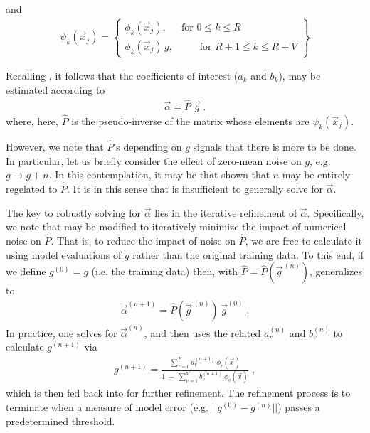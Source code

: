 \documentclass[twocolumn,aps,prd,floatfix,preprintnumbers,a4paper,nofootinbib,
superscriptaddress,10pt]{revtex4-1}
\begin{document}
%
and
%
\begin{align}
  \psi_k(\vec{x}_j) = \left\{\begin{array}{cc}
        \phi_k(\vec{x}_j),      & \text{for }0\leq k\leq R\\
        \phi_k(\vec{x}_j)\, g , & \quad \;\; \;\text{for }R+1\leq k\leq R+V
        \end{array} \right\}
\end{align}
%
\par Recalling , it follows that the coefficients of interest ($a_k$ and $b_k$), may be estimated according to
%
\begin{align}
  \label{eq:pinv2}
  \vec{\alpha} = \hat{P} \; \vec{g} \;.
\end{align}
%
where, here, $\hat{P}$ is the pseudo-inverse of the matrix whose elements are $\psi_k(\vec{x}_j)$.
%
\par However, we note that $\hat{P}$'s depending on $g$ signals that there is more to be done.
%
In particular, let us briefly consider the effect of zero-mean noise on $g$, e.g. $g \rightarrow g+n$.
%
In this contemplation, it may be that shown that $n$ may be entirely regelated to $\hat{P}$.
%
It is in this sense that  is insufficient to generally solve for $\vec{\alpha}$.
%
\par The key to robustly solving for $\vec{\alpha}$ lies in the iterative refinement of $\vec{\alpha}$.
%
Specifically, we note that  may be modified to iteratively minimize the impact of numerical noise on $\hat{P}$.
%
That is, to reduce the impact of noise on $\hat{P}$, we are free to calculate it using model evaluations of $g$ rather than the original training data.
%
To this end, if we define $g^{(0)}=g$ (i.e. the training data) then, with $\hat{P} = \hat{P}( \vec{g}^{\,(n)} )$,  generalizes to
%
\begin{align}
  \label{eq:pinv3}
  \vec{\alpha}^{(n+1)} = \hat{P}(\vec{g}^{\,(n)}) \, \vec{g}^{(0)}\;.
\end{align}
%
In practice, one solves  for $\vec{\alpha}^{(n)}$, and then uses the related $a_r^{(n)}$ and $b_v^{(n)}$ to calculate $g^{(n+1)}$ via
%
\begin{align}
  \label{eq:rat4}
  g^{(n+1)} =  \frac{ \sum_{r=0}^{R} a^{(n+1)}_r \, \phi_{r}(\vec{x}) }{ 1\;-\;  \sum_{v=1}^{V} b^{(n+1)}_v \, \phi_{v}(\vec{x}) } \; ,
\end{align}
%
which is then fed back into  for further refinement.
%
The refinement process is to terminate when a measure of model error (e.g. $||g^{(0)}-g^{(n)}||$) passes a predetermined threshold.
\end{document}
